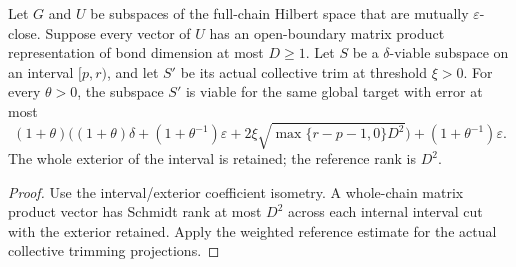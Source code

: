 \begin{lemma}
    \label{lem:alvv-interval-reference-weighted}
    \leanok
    Let $G$ and $U$ be subspaces of the full-chain Hilbert space that are mutually
    $\varepsilon$-close. Suppose every vector of $U$ has an open-boundary matrix
    product representation of bond dimension at most $D\geq 1$. Let $S$ be a
    $\delta$-viable subspace on an interval $[p,r)$, and let $S'$ be its actual
    collective trim at threshold $\xi>0$. For every $\theta>0$, the subspace $S'$
    is viable for the same global target with error at most
    \[
        (1+\theta)\bigl((1+\theta)\delta+(1+\theta^{-1})\varepsilon
        +2\xi\sqrt{\max\{r-p-1,0\}D^2}\bigr)
        +(1+\theta^{-1})\varepsilon.
    \]
    The whole exterior of the interval is retained; the reference rank is $D^2$.
\end{lemma}
\begin{proof}\leanok
    Use the interval/exterior coefficient isometry. A whole-chain matrix product
    vector has Schmidt rank at most $D^2$ across each internal interval cut
    with the exterior retained. Apply the weighted reference estimate for the
    actual collective trimming projections.
\end{proof}

